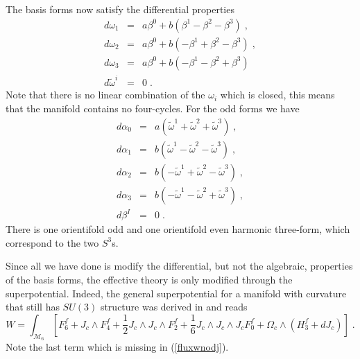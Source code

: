 \documentclass[11pt,a4paper]{article}
\numberwithin{equation}{section}
\numberwithin{table}{section}\setlength{\multlinegap}{25pt}
\newcommand{\bea}{\begin{eqnarray}}  \newcommand{\eea}{\end{eqnarray}}
\newcommand{\nn}{\nonumber}
\newcommand{\cM}{\mathcal M}
\newcommand{\be}{\begin{equation}}
\newcommand{\ee}{\end{equation}}
\begin{document}
The basis forms now satisfy the differential properties
\bea
d \omega_1 &=& a \beta^0 + b \left( \beta^1 - \beta^2 - \beta^3 \right) \;, \nn \\
d \omega_2 &=& a \beta^0 + b \left( -\beta^1 + \beta^2 - \beta^3 \right) \;, \nn \\
d \omega_3 &=& a \beta^0 + b \left( -\beta^1 - \beta^2 + \beta^3 \right) \; \nn \\
d \tilde{\omega}^i &=& 0 \;.
\label{diff1}
\eea
Note that there is no linear combination of the $\omega_i$ which is closed, this means that the manifold contains no four-cycles. For the odd forms we have
\bea
d \alpha_0 &=& a \left( \tilde{\omega}^1 +  \tilde{\omega}^2 +  \tilde{\omega}^3 \right) \;, \nn \\
d \alpha_1 &=& b \left( \tilde{\omega}^1 -  \tilde{\omega}^2 -  \tilde{\omega}^3 \right) \;, \nn \\
d \alpha_2 &=& b \left( -\tilde{\omega}^1 +  \tilde{\omega}^2 -  \tilde{\omega}^3 \right) \;, \nn \\
d \alpha_3 &=& b \left( -\tilde{\omega}^1 -  \tilde{\omega}^2 +  \tilde{\omega}^3 \right) \;, \nn \\
d \beta^I &=& 0 \;.
\label{diff2}
\eea
There is one orientifold odd and one orientifold even harmonic three-form, which correspond to the two $S^3$s.

Since all we have done is modify the differential, but not the algebraic, properties of the basis forms, the effective theory is only modified through the superpotential. Indeed, the general superpotential for a manifold with curvature that still has $SU(3)$ structure was derived in \cite{Grimm:2004ua,Derendinger:2004jn,Villadoro:2005cu,House:2005yc,Grana:2005ny,Benmachiche:2006df} and reads
\be
W = \int_{\cM_6} \left[ F^f_6 + J_c \wedge F^f_4 + \frac12 J_c \wedge J_c \wedge F^f_2 +  \frac16 J_c \wedge J_c \wedge J_c F^f_0 + \Omega_c \wedge \left( H^f_3 + d J_c \right) \right] \;.
\label{wt6dj}
\ee
Note the last term which is missing in (\ref{fluxwnodj}). 
\end{document}
